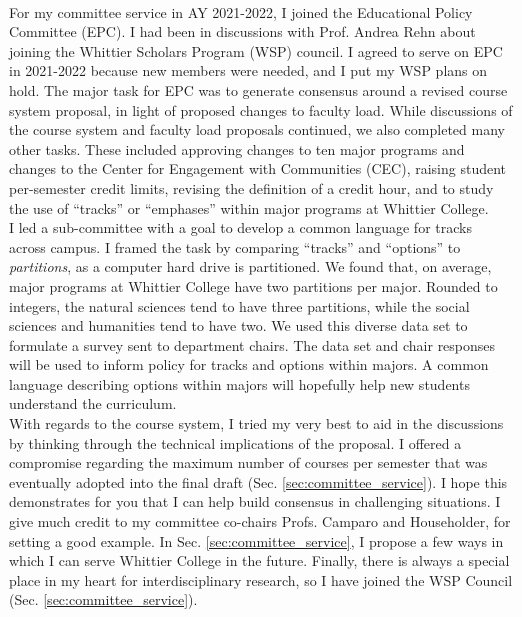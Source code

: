 \documentclass[../../main.tex]{subfiles}
\begin{document}
\\
\vspace{0.15cm}
For my committee service in AY 2021-2022, I joined the Educational Policy Committee (EPC).  I had been in discussions with Prof. Andrea Rehn about joining the Whittier Scholars Program (WSP) council.  I agreed to serve on EPC in 2021-2022 because new members were needed, and I put my WSP plans on hold.  The major task for EPC was to generate consensus around a revised course system proposal, in light of proposed changes to faculty load.  While discussions of the course system and faculty load proposals continued, we also completed many other tasks.  These included approving changes to ten major programs and changes to the Center for Engagement with Communities (CEC), raising student per-semester credit limits, revising the definition of a credit hour, and to study the use of ``tracks'' or ``emphases'' within major programs at Whittier College.
\\
\vspace{0.15cm}
I led a sub-committee with a goal to develop a common language for tracks across campus.  I framed the task by comparing ``tracks'' and ``options'' to \textit{partitions}, as a computer hard drive is partitioned.  We found that, on average, major programs at Whittier College have two partitions per major. Rounded to integers, the natural sciences tend to have three partitions, while the social sciences and humanities tend to have two.  We used this diverse data set to formulate a survey sent to department chairs.  The data set and chair responses will be used to inform policy for tracks and options within majors.  A common language describing options within majors will hopefully help new students understand the curriculum.
\\
\vspace{0.15cm}
With regards to the course system, I tried my very best to aid in the discussions by thinking through the technical implications of the proposal.  I offered a compromise regarding the maximum number of courses per semester that was eventually adopted into the final draft (Sec. \ref{sec:committee_service}).  I hope this demonstrates for you that I can help build consensus in challenging situations.  I give much credit to my committee co-chairs Profs. Camparo and Householder, for setting a good example.  In Sec. \ref{sec:committee_service}, I propose a few ways in which I can serve Whittier College in the future.  Finally, there is always a special place in my heart for interdisciplinary research, so I have joined the WSP Council (Sec. \ref{sec:committee_service}).
\end{document}
